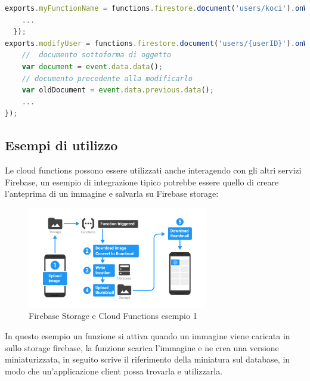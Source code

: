 \begin{lstlisting}[language=javascript,caption={Cloud functions esempio 1 }]
exports.myFunctionName = functions.firestore.document('users/koci').onWrite((event) => {
    ...
  });
exports.modifyUser = functions.firestore.document('users/{userID}').onWrite(event => {
    //  documento sottoforma di oggetto
    var document = event.data.data();
    // documento precedente alla modificarlo
    var oldDocument = event.data.previous.data();
    ...
});
\end{lstlisting}


\newpage              %
\subsection{Esempi di utilizzo}
Le cloud functions possono essere utilizzati anche interagendo con gli altri servizi Firebase, un esempio di integrazione tipico potrebbe essere quello di creare l'anteprima di un immagine e salvarla su Firebase storage:

\begin{figure}[!hb]

  \includegraphics[width=0.7\textwidth]{immagini/functions_ex1.png}
  \caption{Firebase Storage e Cloud Functions esempio 1}\label{fig:Firebase Storage e Cloud Functions esempio 1}
\end{figure}

In questo esempio un funzione si attiva quando un immagine viene caricata in sullo storage firebase, la funzione scarica l'immagine e ne crea una versione miniaturizzata, in seguito scrive il riferimento della miniatura sul database, in modo che un'applicazione client possa trovarla e utilizzarla.\\
%
%

